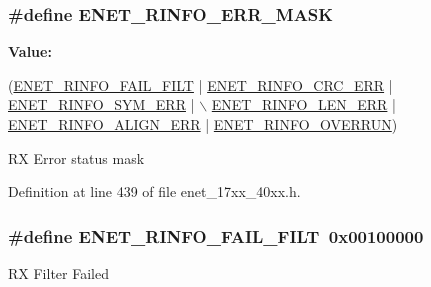 \subsubsection[{\texorpdfstring{E\+N\+E\+T\+\_\+\+R\+I\+N\+F\+O\+\_\+\+E\+R\+R\+\_\+\+M\+A\+SK}{ENET_RINFO_ERR_MASK}}]{\setlength{\rightskip}{0pt plus 5cm}\#define E\+N\+E\+T\+\_\+\+R\+I\+N\+F\+O\+\_\+\+E\+R\+R\+\_\+\+M\+A\+SK}\hypertarget{group__ENET__17XX__40XX_ga07c87e5b7136302124084fee594d2d4a}{}\label{group__ENET__17XX__40XX_ga07c87e5b7136302124084fee594d2d4a}
{\bfseries Value\+:}
\begin{DoxyCode}
(\hyperlink{group__ENET__17XX__40XX_gaf3bb0d91c0511c58691d7189b551fe79}{ENET\_RINFO\_FAIL\_FILT} | \hyperlink{group__ENET__17XX__40XX_gad7ea1586c49309069d1d72a4ebe5aa89}{ENET\_RINFO\_CRC\_ERR}   | 
      \hyperlink{group__ENET__17XX__40XX_ga6c8d6c27397230acdab0d86aae333adb}{ENET\_RINFO\_SYM\_ERR} |  \hyperlink{group__ENET__17XX__40XX_ga9a8b65ee2091950cb6a66c2cf2f8be79}{\(\backslash\)}
\hyperlink{group__ENET__17XX__40XX_ga9a8b65ee2091950cb6a66c2cf2f8be79}{                                 ENET\_RINFO\_LEN\_ERR}   | 
      \hyperlink{group__ENET__17XX__40XX_ga4e4fcb457d4d1a16900c13f7a5a2db46}{ENET\_RINFO\_ALIGN\_ERR} | \hyperlink{group__ENET__17XX__40XX_gac8b350c71c904bca07eab6e4338303cf}{ENET\_RINFO\_OVERRUN})
\end{DoxyCode}
RX Error status mask 

Definition at line 439 of file enet\+\_\+17xx\+\_\+40xx.\+h.

\subsubsection[{\texorpdfstring{E\+N\+E\+T\+\_\+\+R\+I\+N\+F\+O\+\_\+\+F\+A\+I\+L\+\_\+\+F\+I\+LT}{ENET_RINFO_FAIL_FILT}}]{\setlength{\rightskip}{0pt plus 5cm}\#define E\+N\+E\+T\+\_\+\+R\+I\+N\+F\+O\+\_\+\+F\+A\+I\+L\+\_\+\+F\+I\+LT~0x00100000}\hypertarget{group__ENET__17XX__40XX_gaf3bb0d91c0511c58691d7189b551fe79}{}\label{group__ENET__17XX__40XX_gaf3bb0d91c0511c58691d7189b551fe79}
RX Filter Failed 

